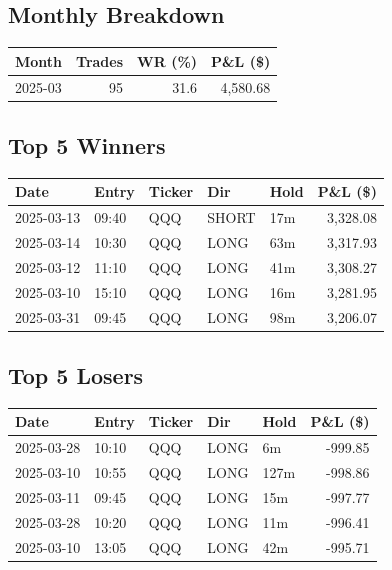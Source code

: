 \documentclass[11pt,a4paper,twoside]{article}
\begin{document}
\subsection{Monthly Breakdown}
\noindent\begin{center}
\begin{tabular}{>{\color{txtmain}}l rrr}
\toprule
\rowcolor{cardbg}
\textbf{Month} & \textbf{Trades} & \textbf{WR (\%)} & \textbf{P\&L (\$)} \\
\midrule
2025-03 & 95 & 31.6 & \textcolor{wingreen}{4,580.68} \\
\bottomrule
\end{tabular}
\end{center}
\subsection{Top 5 Winners}
\noindent\begin{center}
\begin{tabular}{>{\color{txtmain}}l llll r}
\toprule
\rowcolor{cardbg}
\textbf{Date} & \textbf{Entry} & \textbf{Ticker} & \textbf{Dir} & \textbf{Hold} & \textbf{P\&L (\$)} \\
\midrule
2025-03-13 & 09:40 & QQQ & SHORT & 17m & \textcolor{wingreen}{3,328.08} \\
2025-03-14 & 10:30 & QQQ & LONG & 63m & \textcolor{wingreen}{3,317.93} \\
2025-03-12 & 11:10 & QQQ & LONG & 41m & \textcolor{wingreen}{3,308.27} \\
2025-03-10 & 15:10 & QQQ & LONG & 16m & \textcolor{wingreen}{3,281.95} \\
2025-03-31 & 09:45 & QQQ & LONG & 98m & \textcolor{wingreen}{3,206.07} \\
\bottomrule
\end{tabular}
\end{center}
\subsection{Top 5 Losers}
\noindent\begin{center}
\begin{tabular}{>{\color{txtmain}}l llll r}
\toprule
\rowcolor{cardbg}
\textbf{Date} & \textbf{Entry} & \textbf{Ticker} & \textbf{Dir} & \textbf{Hold} & \textbf{P\&L (\$)} \\
\midrule
2025-03-28 & 10:10 & QQQ & LONG & 6m & \textcolor{lossred}{-999.85} \\
2025-03-10 & 10:55 & QQQ & LONG & 127m & \textcolor{lossred}{-998.86} \\
2025-03-11 & 09:45 & QQQ & LONG & 15m & \textcolor{lossred}{-997.77} \\
2025-03-28 & 10:20 & QQQ & LONG & 11m & \textcolor{lossred}{-996.41} \\
2025-03-10 & 13:05 & QQQ & LONG & 42m & \textcolor{lossred}{-995.71} \\
\bottomrule
\end{tabular}
\end{center}
\clearpage
\end{document}
